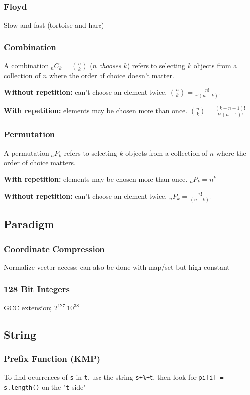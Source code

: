 \documentclass[12pt, a4paper, twoside]{article}
\begin{document}
\subsubsection{Floyd}
Slow and fast (tortoise and hare)

\subsubsection{Combination}
A combination ${}_nC_k = \binom{n}{k}$ ($n$ \textit{chooses} $k$) refers to selecting $k$ objects from a collection of $n$ where the order of choice doesn't matter.

\textbf{Without repetition:} can't choose an element twice. $\binom{n}{k} = \frac{n!}{r!(n-k)!}$

\textbf{With repetition:} elements may be chosen more than once. $\binom{n}{k} = \frac{(k+n-1)!}{k!(n-1)!}$

\subsubsection{Permutation}
A permutation ${}_nP_k$ refers to selecting $k$ objects from a collection of $n$ where the order of choice matters.

\textbf{With repetition:} elements may be chosen more than once. ${}_nP_k = n^k$

\textbf{Without repetition:} can't choose an element twice. ${}_nP_k = \frac{n!}{(n-k)!}$

\subsection{Paradigm}
\subsubsection{Coordinate Compression}
Normalize vector access; can also be done with map/set but high constant

\subsubsection{128 Bit Integers}
GCC extension; $2^{127} ~ 10^{38}$

\subsection{String}
\subsubsection{Prefix Function (KMP)}
To find ocurrences of \texttt{s} in \texttt{t}, use the string \texttt{s+\%+t}, then look for \texttt{pi[i] = s.length()} on the "\texttt{t} side"
\end{document}
